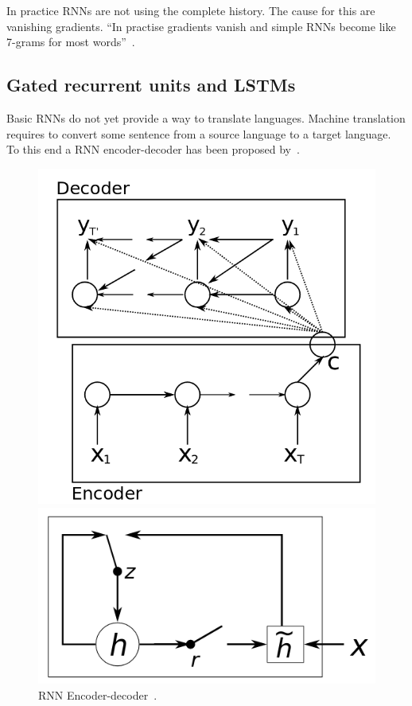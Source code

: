 In practice RNNs are not using the complete history.
The cause for this are vanishing gradients.
``In practise gradients vanish and simple RNNs become like 7-grams for most words''~\citep{manning2017lectures}.

\subsection{Gated recurrent units and LSTMs}
\label{subsec:gru}
Basic RNNs do not yet provide a way to translate languages.
Machine translation requires to convert some sentence from a source language to a target language.
To this end a RNN encoder-decoder has been proposed by~\citet{cho2014learning}.

\begin{figure}
    \centering
    \begin{minipage}{0.48\textwidth}
        \includegraphics[width=\textwidth]{figures/encoder_decoder.png}
        \caption{RNN Encoder-decoder~\cite[Figure 1]{cho2014learning}.}
    \label{fig:encoder_decoder}
    \end{minipage}
    \hspace*{3mm}
    \begin{minipage}{0.48\textwidth}
        \includegraphics[width=\textwidth]{figures/gru.png}

\end{minipage}
\end{figure}

